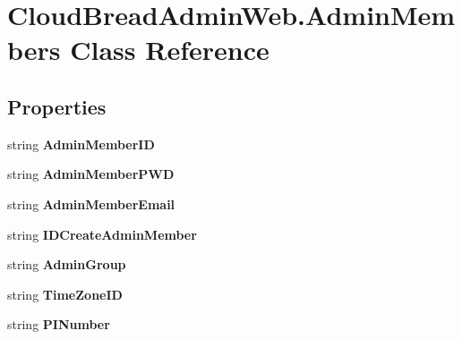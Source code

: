 \hypertarget{a00012}{}\section{Cloud\+Bread\+Admin\+Web.\+Admin\+Members Class Reference}
\label{a00012}
\subsection*{Properties}
\begin{DoxyCompactItemize}
\item 
string {\bfseries Admin\+Member\+ID}\hypertarget{a00012_a789965c910c6e95f3022fc9cc82bfdff}{}\label{a00012_a789965c910c6e95f3022fc9cc82bfdff}

\item 
string {\bfseries Admin\+Member\+P\+WD}\hypertarget{a00012_a6adda13ceddd29e0bf6f5f305f8642f6}{}\label{a00012_a6adda13ceddd29e0bf6f5f305f8642f6}

\item 
string {\bfseries Admin\+Member\+Email}\hypertarget{a00012_a9e25237e1976bc16d10fb106e77f8af3}{}\label{a00012_a9e25237e1976bc16d10fb106e77f8af3}

\item 
string {\bfseries I\+D\+Create\+Admin\+Member}\hypertarget{a00012_a632bd030e0a37d82975424778c65af52}{}\label{a00012_a632bd030e0a37d82975424778c65af52}

\item 
string {\bfseries Admin\+Group}\hypertarget{a00012_a7adfcf8d4647e3e77dc72811c64c2072}{}\label{a00012_a7adfcf8d4647e3e77dc72811c64c2072}

\item 
string {\bfseries Time\+Zone\+ID}\hypertarget{a00012_a67502855caf6084a56d944bdb3c2785b}{}\label{a00012_a67502855caf6084a56d944bdb3c2785b}

\item 
string {\bfseries P\+I\+Number}\hypertarget{a00012_a0da36d960060a3353ce7318490e16330}{}\label{a00012_a0da36d960060a3353ce7318490e16330}


\end{DoxyCompactItemize}
